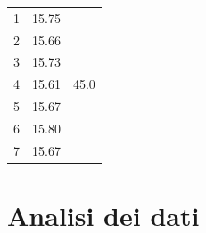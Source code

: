 \documentclass{article}
\begin{document}
\begin{table}[h!]
\begin{minipage}{0.1\textwidth}
\begin{tabular}{ | r | c | c | }
    				\hline
    				1 & 15.75 & \multirow{7}{*}{45.0} \\ \cline{1-2}
    				2 & 15.66 & \\ \cline{1-2}
    				3 & 15.73 & \\ \cline{1-2}
    				4 & 15.61 & \\ \cline{1-2}
    				5 & 15.67 & \\ \cline{1-2}
    				6 & 15.80 & \\ \cline{1-2}
    				7 & 15.67 & \\ \cline{1-2}
    				\hline
			\end{tabular}
	\end{minipage}
	
\end{table}
\section{Analisi dei dati}
\end{document}
